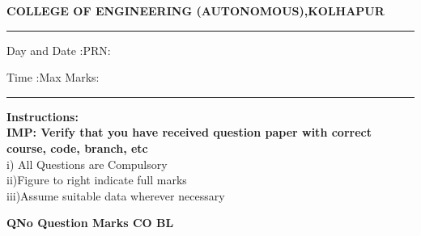 \documentclass[12pt]{article}
\begin{document}
	\par
	{\bf{COLLEGE OF ENGINEERING (AUTONOMOUS),KOLHAPUR}}
	\par\noindent\rule{\textwidth}{0.4pt}
	
	\par
	\par
	\par
	\begin{flushleft}
		Day and Date :{}\hspace{5.5cm}PRN:
	\end{flushleft}
	
	\begin{flushleft}
		Time :{}\hspace{7cm}Max Marks:{\VAR{maxm}}\\
	\end{flushleft}
	\noindent\rule{\textwidth}{0.1pt}
\begin{flushleft}
	{\bf Instructions:}\\
	{\hspace{0.5cm} \bf IMP: Verify that you have received question paper with correct course, code, branch, etc}\\
	\hspace{1cm}i) All Questions are Compulsory\\
	\hspace{1cm}ii)Figure to right indicate full marks\\
	\hspace{1cm}iii)Assume suitable data wherever necessary\\
\end{flushleft}

	\begin{flushleft}
	\bf{QNo}\hspace{1.2cm} \bf{Question} \hspace{5.5cm}  \bf{Marks} \hspace{0.2cm} \bf{CO} \hspace{0.2cm}	\bf{BL}	
	
\end{flushleft} 
\end{document}
